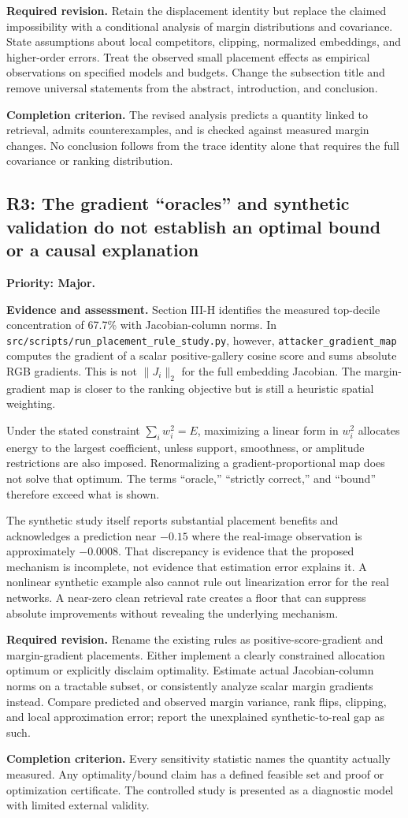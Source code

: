 \documentclass[11pt,a4paper]{article}
\newcommand{\finding}[3]{\subsection{#1: #3}\label{rev:#1}\textbf{Priority: #2.}}
\newcommand{\file}[1]{\nolinkurl{#1}}
\newcommand{\evidence}{\par\textbf{Evidence and assessment.} }
\newcommand{\action}{\par\textbf{Required revision.} }
\newcommand{\acceptance}{\par\textbf{Completion criterion.} }
\begin{document}
\action
Retain the displacement identity but replace the claimed impossibility with a conditional analysis of margin distributions and covariance. State assumptions about local competitors, clipping, normalized embeddings, and higher-order errors. Treat the observed small placement effects as empirical observations on specified models and budgets. Change the subsection title and remove universal statements from the abstract, introduction, and conclusion.
\acceptance
The revised analysis predicts a quantity linked to retrieval, admits counterexamples, and is checked against measured margin changes. No conclusion follows from the trace identity alone that requires the full covariance or ranking distribution.

\finding{R3}{Major}{The gradient ``oracles'' and synthetic validation do not establish an optimal bound or a causal explanation}
\evidence
Section III-H identifies the measured top-decile concentration of 67.7\% with Jacobian-column norms. In \file{src/scripts/run_placement_rule_study.py}, however, \file{attacker_gradient_map} computes the gradient of a scalar positive-gallery cosine score and sums absolute RGB gradients. This is not $\|J_i\|_2$ for the full embedding Jacobian. The margin-gradient map is closer to the ranking objective but is still a heuristic spatial weighting.

Under the stated constraint $\sum_iw_i^2=E$, maximizing a linear form in $w_i^2$ allocates energy to the largest coefficient, unless support, smoothness, or amplitude restrictions are also imposed. Renormalizing a gradient-proportional map does not solve that optimum. The terms ``oracle,'' ``strictly correct,'' and ``bound'' therefore exceed what is shown.

The synthetic study itself reports substantial placement benefits and acknowledges a prediction near $-0.15$ where the real-image observation is approximately $-0.0008$. That discrepancy is evidence that the proposed mechanism is incomplete, not evidence that estimation error explains it. A nonlinear synthetic example also cannot rule out linearization error for the real networks. A near-zero clean retrieval rate creates a floor that can suppress absolute improvements without revealing the underlying mechanism.

\action
Rename the existing rules as positive-score-gradient and margin-gradient placements. Either implement a clearly constrained allocation optimum or explicitly disclaim optimality. Estimate actual Jacobian-column norms on a tractable subset, or consistently analyze scalar margin gradients instead. Compare predicted and observed margin variance, rank flips, clipping, and local approximation error; report the unexplained synthetic-to-real gap as such.
\acceptance
Every sensitivity statistic names the quantity actually measured. Any optimality/bound claim has a defined feasible set and proof or optimization certificate. The controlled study is presented as a diagnostic model with limited external validity.
\end{document}
